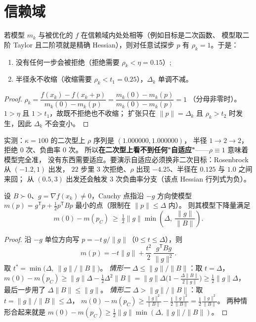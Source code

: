 \section{信赖域}

\begin{theorem}
\label{thm:tr-rho-one}
若模型 $m_k$ 与被优化的 $f$ 在信赖域内处处相等（例如目标是二次函数、
模型取二阶 Taylor 且二阶项就是精确 Hessian），则对任意试探步 $p$ 有
$\rho_k=1$。于是：
\begin{enumerate}
  \item 没有任何一步会被拒绝（拒绝需要 $\rho_k<\eta=0.15$）;
  \item 半径永不收缩（收缩需要 $\rho_k<t_1=0.25$），$\Delta_k$ 单调不减。
\end{enumerate}
\end{theorem}

\begin{proof}
$\rho_k=\dfrac{f(x_k)-f(x_k+p)}{m_k(0)-m_k(p)}=\dfrac{m_k(0)-m_k(p)}{m_k(0)-m_k(p)}=1$
（分母非零时）。$1>\eta$ 且 $1>t_1$，故既不拒绝也不收缩；
扩张只在 $\|p\|=\Delta_k$ 且 $\rho_k>t_2$ 时发生，因此 $\Delta_k$ 不会变小。
\end{proof}

实测：$\kappa=100$ 的二次型上 $\rho$ 序列是 $(1.000000,1.000000)$，
半径 $1\to2\to2$，拒绝 $0$ 次、负曲率 $0$ 次。
所以\textbf{在二次型上看不到任何"自适应"}——$\rho\equiv1$ 意味着模型完全准，
没有东西需要适应。要演示自适应必须换非二次目标：Rosenbrock 从 $(-1.2,1)$ 出发，
$22$ 步里 $3$ 次拒绝、$\rho$ 出现 $-4.25$、半径在 $0.125$ 与 $1.0$ 之间来回；
从 $(0.5,3)$ 出发还会触发 $3$ 次负曲率分支（该点 Hessian 行列式为负）。

\begin{theorem}
\label{thm:cauchy}
设 $B\succ0$、$g=\nabla f(x_k)\ne0$，Cauchy 点指沿 $-g$ 方向使模型
$m(p)=g^{\mathsf T}p+\tfrac12p^{\mathsf T}Bp$ 最小的点（限制在 $\|p\|\le\Delta$ 内）。
则其模型下降量满足
\[
  m(0)-m(p_C)\ \ge\ \tfrac12\|g\|\min\!\left(\Delta,\ \frac{\|g\|}{\|B\|}\right).
\]
\end{theorem}

\begin{proof}
沿 $-g$ 单位方向写 $p=-t\,g/\|g\|$（$0\le t\le\Delta$），则
\[
  m(p)=-t\|g\|+\frac{t^2}{2}\,\frac{g^{\mathsf T}Bg}{\|g\|^2}.
\]
取 $t^\ast=\min\bigl(\Delta,\ \|g\|/\|B\|\bigr)$。
\emph{情形一} $\Delta\le\|g\|/\|B\|$：取 $t=\Delta$，
$m(0)-m(p_C)\ge\|g\|\Delta-\frac12\Delta^2\|B\|
=\|g\|\Delta\bigl(1-\frac{\Delta\|B\|}{2\|g\|}\bigr)
\ge\frac12\|g\|\Delta$，
最后一步用了 $\Delta\|B\|\le\|g\|$。
\emph{情形二} $\Delta>\|g\|/\|B\|$：取 $t=\|g\|/\|B\|\le\Delta$，
$m(0)-m(p_C)\ge\frac{\|g\|^2}{\|B\|}-\frac12\frac{\|g\|^2}{\|B\|}
=\frac12\frac{\|g\|^2}{\|B\|}$。
两种情形合起来就是
$m(0)-m(p_C)\ge\frac12\|g\|\min(\Delta,\|g\|/\|B\|)$。
\end{proof}

